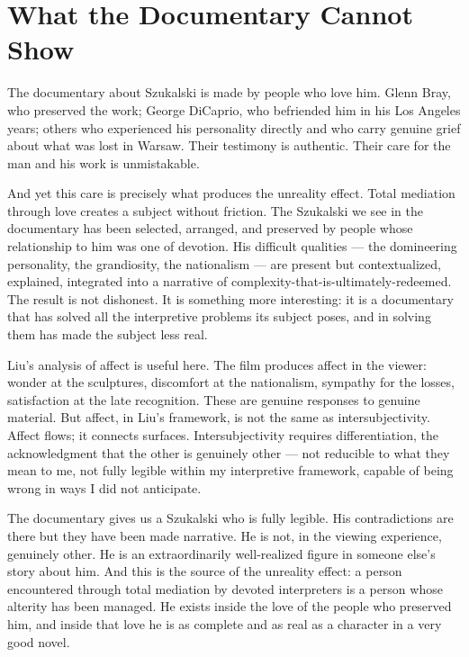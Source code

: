 \documentclass[11pt, a4paper]{article}
\theoremstyle{named}
\begin{document}
\section{What the Documentary Cannot Show}

The documentary about Szukalski is made by people who love him.
Glenn Bray, who preserved the work; George DiCaprio, who befriended
him in his Los Angeles years; others who experienced his personality
directly and who carry genuine grief about what was lost in Warsaw.
Their testimony is authentic. Their care for the man and his work is
unmistakable.

And yet this care is precisely what produces the unreality effect.
Total mediation through love creates a subject without friction.
The Szukalski we see in the documentary has been selected, arranged,
and preserved by people whose relationship to him was one of devotion.
His difficult qualities — the domineering personality, the grandiosity,
the nationalism — are present but contextualized, explained,
integrated into a narrative of complexity-that-is-ultimately-redeemed.
The result is not dishonest. It is something more interesting: it is
a documentary that has solved all the interpretive problems its subject
poses, and in solving them has made the subject less real.

Liu's analysis of affect is useful here. The film produces affect in
the viewer: wonder at the sculptures, discomfort at the nationalism,
sympathy for the losses, satisfaction at the late recognition. These
are genuine responses to genuine material. But affect, in Liu's
framework, is not the same as intersubjectivity. Affect flows; it
connects surfaces. Intersubjectivity requires differentiation, the
acknowledgment that the other is genuinely other — not reducible to
what they mean to me, not fully legible within my interpretive
framework, capable of being wrong in ways I did not anticipate.

The documentary gives us a Szukalski who is fully legible. His
contradictions are there but they have been made narrative. He is
not, in the viewing experience, genuinely other. He is an
extraordinarily well-realized figure in someone else's story about
him. And this is the source of the unreality effect: a person
encountered through total mediation by devoted interpreters is a
person whose alterity has been managed. He exists inside the love
of the people who preserved him, and inside that love he is as
complete and as real as a character in a very good novel.
\end{document}
